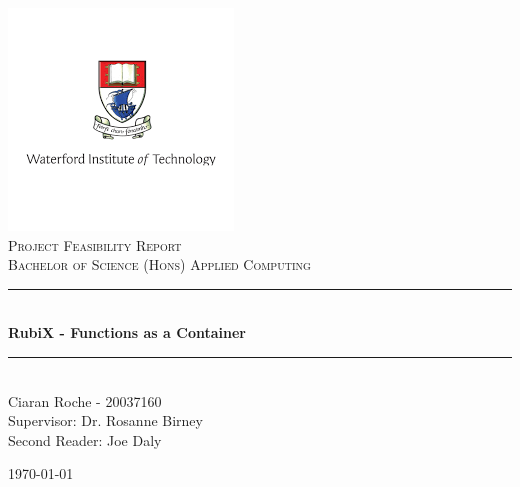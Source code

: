 \begin{titlepage}

\newcommand{\HRule}{\rule{\linewidth}{0.5mm}}

\center

\includegraphics{images/logo.png}\\
\textsc{\Large Project Feasibility Report}\\[0.5cm]
\textsc{\large Bachelor of Science (Hons) Applied Computing }\\[0.5cm] 


\HRule \\[0.4cm]
{ \huge \bfseries RubiX - Functions as a Container}\\[0.4cm] 
\HRule \\[1.5cm]

\Large Ciaran Roche - 20037160\\[3cm]
\large Supervisor: Dr. Rosanne Birney
\\\large Second Reader: Joe Daly

{\large \today}\\[1cm]

\vfill 

\end{titlepage}
